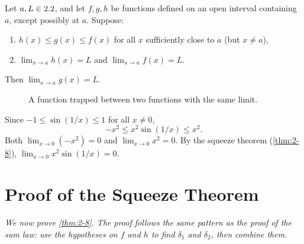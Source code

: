 \begin{theorem}
\label{thm:2-8}
Let $a, L \in 2.2$, and let $f, g, h$ be functions defined on an open interval containing $a$, except possibly at $a$.  Suppose:
\begin{enumerate}[label=(\roman*)]
  \item $h(x) \leq g(x) \leq f(x)$ for all $x$ sufficiently close to $a$ (but $x \neq a$),
  \item $\lim_{x \to a} h(x) = L$ and $\lim_{x \to a} f(x) = L$.
\end{enumerate}
Then $\lim_{x \to a} g(x) = L$.
\end{theorem}

\begin{figure}[ht]
  \centering
  
  \caption{A function trapped between two functions with the same limit.}
  \label{fig:squeeze-theorem}
\end{figure}

\begin{example}
\label{ex:2-9}
Since $-1 \leq \sin(1/x) \leq 1$ for all $x \neq 0$,
\[
  -x^{2} \leq x^{2}\sin(1/x) \leq x^{2}.
\]
Both $\lim_{x \to 0}(-x^{2}) = 0$ and $\lim_{x \to 0} x^{2} = 0$.  By the squeeze theorem (\cref{thm:2-8}), $\lim_{x \to 0} x^{2}\sin(1/x) = 0$.
\end{example}

\section{Proof of the Squeeze Theorem}
\label{sec:2.13}

\textit{We now prove \cref{thm:2-8}.  The proof follows the same pattern as the proof of the sum law: use the hypotheses on $f$ and $h$ to find $\delta_{1}$ and $\delta_{2}$, then combine them.}

